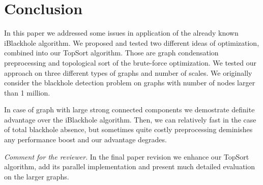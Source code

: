 \documentclass{svproc}
\begin{document}
\section{Conclusion}

In this paper we addressed some issues in application of the already known iBlackhole algorithm. We proposed and tested two different ideas of optimization, combined into
our TopSort algorithm. Those are graph condensation preprocessing and topological sort of the brute-force optimization. We tested our approach on three different types of graphs and number of scales. We originally consider the blackhole detection problem on graphs with number of nodes larger than 1 million. 

In case of graph with large strong connected components we demostrate definite advantage over the iBlackhole algorithm. Then, we can relatively fast in the case of total blackhole absence, but sometimes quite costly preprocessing
deminishes any performance boost and our advantage  degrades.



\textit{Comment for the reviewer}. In the final paper revision we enhance our TopSort algorithm, add its parallel implementation and present much detailed evaluation on the larger graphs. 

%
%


\end{document}
